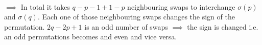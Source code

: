 \documentclass{report}
\begin{document}
\begin{comment}
\begin{multicols}{2}
\underline{Backwards} 
\begin{align*}
 \sigma\left( p+1 \right)  \sigma\left( p+2 \right) \ldots \sigma\left( q-1 \right)  \sigma\left( q \right) \sigma\left( q \right) \sigma\left(  p \right) \\
 \sigma\left( p+1 \right) \sigma\left( p+2  \right)  \ldots \sigma\left( q \right) \sigma\left( q-1 \right) \sigma\left(  p \right)\\
 \sigma\left( p+1 \right) \sigma\left( p+2  \right) \ldots \sigma\left( q \right) \sigma\left( q-2 \right) \sigma\left( q-1 \right) \sigma\left(  p \right)\\
 \vdots \\
 \sigma \left( q \right) \underbrace{\sigma \left( p+1 \right)}_{\sigma\left( q- \left( q-p-1 \right)  \right) } \sigma\left( p+1 \right) \ldots \sigma \left( q-1 \right) \sigma\left( p \right) 
.\end{align*}

\break
Number of inversions\\
1\\
2
\end{multicols}


\end{comment}













\\
$\implies$ In total it takes $q-p-1+1-p$ neighbouring swaps to interchange $\sigma\left( p \right) $ and $\sigma\left( q \right) $. Each one of those neighbouring swaps changes the sign of the permutation. $2q-2p+1$ is an odd number of swaps $\implies$ the sign is changed i.e.  an odd permutations becomes and even and vice versa.\\
\\
\end{document}
